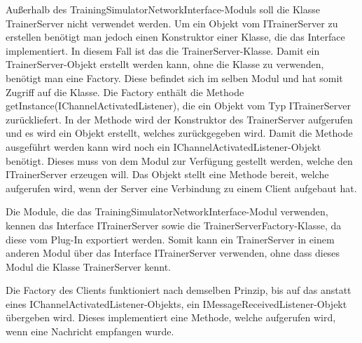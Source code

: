 Außerhalb des TrainingSimulatorNetworkInterface-Moduls soll die Klasse TrainerServer nicht verwendet werden. Um ein Objekt vom ITrainerServer zu erstellen benötigt man jedoch einen Konstruktor einer Klasse, die das Interface implementiert. In diesem Fall ist das die TrainerServer-Klasse. Damit ein TrainerServer-Objekt erstellt werden kann, ohne die Klasse zu verwenden, benötigt man eine Factory. Diese befindet sich im selben Modul und hat somit Zugriff auf die Klasse. Die Factory enthält die Methode getInstance(IChannelActivatedListener), die ein Objekt vom Typ ITrainerServer zurückliefert. In der Methode wird der Konstruktor des TrainerServer aufgerufen und es wird ein Objekt erstellt, welches zurückgegeben wird. Damit die Methode ausgeführt werden kann wird noch ein IChannelActivatedListener-Objekt benötigt. Dieses muss von dem Modul zur Verfügung gestellt werden, welche den ITrainerServer erzeugen will. Das Objekt stellt eine Methode bereit, welche aufgerufen wird, wenn der Server eine Verbindung zu einem Client aufgebaut hat.

Die Module, die das TrainingSimulatorNetworkInterface-Modul verwenden, kennen das Interface ITrainerServer sowie die TrainerServerFactory-Klasse, da diese vom Plug-In exportiert werden. Somit kann ein TrainerServer in einem anderen Modul über das Interface ITrainerServer verwenden, ohne dass dieses Modul die Klasse TrainerServer kennt. 

Die Factory des Clients funktioniert nach demselben Prinzip, bis auf das anstatt eines IChannelActivatedListener-Objekts, ein IMessageReceivedListener-Objekt übergeben wird. Dieses implementiert eine Methode, welche aufgerufen wird, wenn eine Nachricht empfangen wurde.